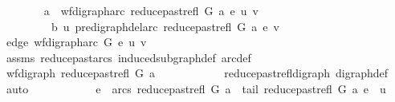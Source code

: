 \begin{isabellebody}
\ \ \ \ \ \ \isamarkupfalse%
\ a{\isacharcolon}{\kern0pt}\ {\isachardoublequoteopen}\ wf{\isacharunderscore}{\kern0pt}digraph{\isachardot}{\kern0pt}arc\ {\isacharparenleft}{\kern0pt}reduce{\isacharunderscore}{\kern0pt}past{\isacharunderscore}{\kern0pt}refl\ G\ a{\isacharparenright}{\kern0pt}\ e\ {\isacharparenleft}{\kern0pt}u{\isacharcomma}{\kern0pt}\ v{\isacharparenright}{\kern0pt}{\isachardoublequoteclose}\isanewline
\ \ \ \ \ \ \ \ \ b{\isacharcolon}{\kern0pt}\ {\isachardoublequoteopen}u\ {\isasymrightarrow}\isactrlsup {\isacharplus}{\kern0pt}\isactrlbsub pre{\isacharunderscore}{\kern0pt}digraph{\isachardot}{\kern0pt}del{\isacharunderscore}{\kern0pt}arc\ {\isacharparenleft}{\kern0pt}reduce{\isacharunderscore}{\kern0pt}past{\isacharunderscore}{\kern0pt}refl\ G\ a{\isacharparenright}{\kern0pt}\ e\isactrlesub \ v{\isachardoublequoteclose}\isanewline
\ \ \ \ \ \ \isamarkupfalse%
\ edge{\isacharcolon}{\kern0pt}\ {\isachardoublequoteopen}wf{\isacharunderscore}{\kern0pt}digraph{\isachardot}{\kern0pt}arc\ G\ e\ {\isacharparenleft}{\kern0pt}u{\isacharcomma}{\kern0pt}\ v{\isacharparenright}{\kern0pt}{\isachardoublequoteclose}\isanewline
\ \ \ \ \ \ \ \ \isamarkupfalse%
\ assms\ reduce{\isacharunderscore}{\kern0pt}past{\isacharunderscore}{\kern0pt}arcs{}\ induced{\isacharunderscore}{\kern0pt}subgraph{\isacharunderscore}{\kern0pt}def\ arc{\isacharunderscore}{\kern0pt}def\ \isanewline
\ \ \ \ \ \ \isamarkupfalse%
\ {\isacharminus}{\kern0pt}\isanewline
\ \ \ \ \ \ \ \ \isamarkupfalse%
\ {\isachardoublequoteopen}wf{\isacharunderscore}{\kern0pt}digraph\ {\isacharparenleft}{\kern0pt}reduce{\isacharunderscore}{\kern0pt}past{\isacharunderscore}{\kern0pt}refl\ G\ a{\isacharparenright}{\kern0pt}{\isachardoublequoteclose}\isanewline
\ \ \ \ \ \ \ \ \ \ \isamarkupfalse%
\ reduce{\isacharunderscore}{\kern0pt}past{\isacharunderscore}{\kern0pt}refl{\isacharunderscore}{\kern0pt}digraph\ digraph{\isacharunderscore}{\kern0pt}def\ \isamarkupfalse%
\ auto\isanewline
\ \ \ \ \ \ \ \ \isamarkupfalse%
\ \isamarkupfalse%
\ {\isachardoublequoteopen}e\ {\isasymin}\ arcs\ {\isacharparenleft}{\kern0pt}reduce{\isacharunderscore}{\kern0pt}past{\isacharunderscore}{\kern0pt}refl\ G\ a{\isacharparenright}{\kern0pt}\ {\isasymand}\ tail\ {\isacharparenleft}{\kern0pt}reduce{\isacharunderscore}{\kern0pt}past{\isacharunderscore}{\kern0pt}refl\ G\ a{\isacharparenright}{\kern0pt}\ e\ {\isacharequal}{\kern0pt}\ u\isanewline

\end{isabellebody}
